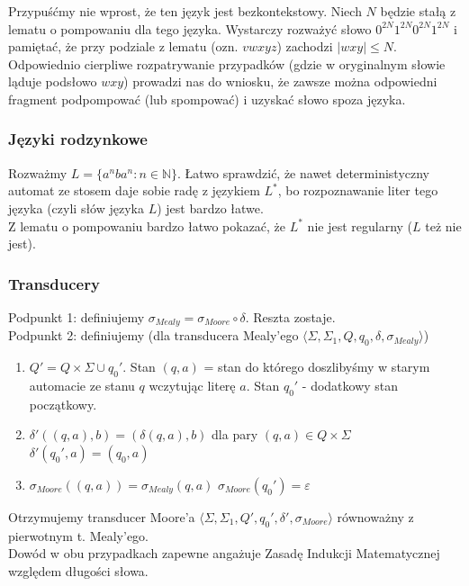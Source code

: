 \documentclass[a4paper,11pt]{article}
\newenvironment{zadanie}[1]
  {\renewcommand\theinnercustomthm{#1}\innercustomthm}
  {\endinnercustomthm}
\begin{document}
\begin{zadanie}{63}
\end{zadanie}
Przypuśćmy nie wprost, że ten język jest bezkontekstowy. Niech $N$ będzie stałą z lematu o pompowaniu dla tego języka. 
Wystarczy rozważyć słowo $0^{2N}1^{2N}0^{2N}1^{2N}$ i pamiętać, że przy podziale z lematu (ozn. $vwxyz$) zachodzi
$|wxy| \leqslant N$. Odpowiednio cierpliwe rozpatrywanie przypadków (gdzie w oryginalnym słowie ląduje podsłowo $wxy$)
prowadzi nas do wniosku, że zawsze można odpowiedni fragment podpompować (lub spompować) i uzyskać słowo spoza języka.


\subsubsection{Języki rodzynkowe}

\begin{zadanie}{71}
\end{zadanie}
Rozważmy $L = \{ a^nba^n : n \in \mathbb{N}\}$. Łatwo sprawdzić, że nawet deterministyczny automat ze stosem daje sobie radę
z językiem $L^*$, bo rozpoznawanie liter tego języka (czyli słów języka $L$) jest bardzo łatwe. \\
Z lematu o pompowaniu bardzo łatwo pokazać, że $L^*$ nie jest regularny ($L$ też nie jest).


\subsubsection{Transducery}

\begin{zadanie}{77}
\end{zadanie}
Podpunkt 1: definiujemy $\sigma_{Mealy} = \sigma_{Moore} \circ \delta$. Reszta zostaje.\\
Podpunkt 2: definiujemy (dla transducera Mealy'ego $\langle \Sigma, \Sigma_1, Q, q_0, \delta, \sigma_{Mealy} \rangle$)
\begin{enumerate}
 \item $Q' = Q \times \Sigma \cup q_0'$. Stan $(q,a)$ = stan do którego doszlibyśmy w starym automacie ze stanu $q$ wczytując
 literę $a$. Stan $q_0'$ - dodatkowy stan początkowy.
 \item 
 \subitem $\delta'((q,a),b) = (\delta(q,a),b)$ dla pary $(q,a) \in Q \times \Sigma$
 \subitem $\delta'(q_0',a) = (q_0,a)$
 \item
 \subitem $\sigma_{Moore}((q,a)) = \sigma_{Mealy}(q,a)$
 \subitem $\sigma_{Moore}(q_0') = \varepsilon$
\end{enumerate}
Otrzymujemy transducer Moore'a $\langle \Sigma, \Sigma_1, Q', q_0', \delta', \sigma_{Moore} \rangle$ równoważny z pierwotnym
t. Mealy'ego. \\
Dowód w obu przypadkach zapewne angażuje Zasadę Indukcji Matematycznej względem długości słowa. \\ \\ 
\end{document}
